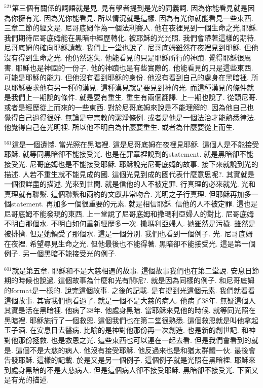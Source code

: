 \documentclass{book}
\begin{document}
$^{521}$第三個有關係的詞語就是見.
見有學者提到是光的同義詞.
因為你能看見就是因為你擁有光.
因為光你能看見.
所以情況就是這樣.
因為有光你就能看見一些東西.
三章二節的經文是.
尼哥底姆作為一個法利賽人.
他在夜裡見到一個生命之光,耶穌.
我們期待尼哥底姆能在黑暗中經歷轉化.
被耶穌的光光照.
我們會帶著這樣的期待.
尼哥底姆的確向耶穌請教.
我們上一堂也說了.
尼哥底姆雖然在夜裡見到耶穌.
但他沒有得到生命之光.
他仍然迷失.
他能看見的只是耶穌所行的神蹟.
覺得耶穌很厲害.
耶穌也是神國的一份子.
他的神蹟也是有些實際的.
他能看見的只是這些東西.
可能是耶穌的能力.
但他沒有看到耶穌的身份.
他沒有看到自己的處身在黑暗裡.
所以耶穌要求他有另一種的漢見.
這種漢見就是要見到神的光.
而這種漢見的條件就是我們上一期說的條件.
就是要有重生.
重生有兩個翻譯.
上一期也說了.
從頭尼哥.
或者是經歷從上而來的一些東西.
對於尼哥底姆來說是不能理解的.
因為他自己也覺得自己過得很好.
無論是守宗教的潔淨條例.
或者是他是一個法治才能熟悉律法.
他覺得自己在光明裡.
所以他不明白為什麼要重生.
或者為什麼要從上而生.

$^{561}$這是一個遺憾.
當光照在黑暗裡.
這是尼哥底姆在夜裡見耶穌.
這個人是不能接受耶穌.
就等同黑暗卻不能接受光.
也是在罪章裡說到的statement.
就是黑暗卻不能接受光.
尼哥底姆也是不能接受耶穌.
耶穌說完尼哥底姆的故事.
接下來就說到光的描述.
人若不重生就不能見成的國.
這個光見到成的國代表什麼意思呢?.
其實就是一個很詳盡的描述.
光來到世間.
就是信他的人不被定罪.
行真理的必來就光.
光和真理就有聯繫.
這個聯繫和兩約的文獻非常吻合.
光明之子行真理.
但耶穌再加多一個statement.
再加多一個很重要的元素.
就是相信耶穌.
信他的人不被定罪.
這也是尼哥底姆不能發現的東西.
上一堂說了尼哥底姆和撒瑪利亞婦人的對比.
尼哥底姆不明白那個水.
不明白如何重新經歷多一次.
撒瑪利亞婦人.
她雖然是污穢.
雖然是被排擠.
但是她領受了那個水.
這是一個分別.
我們也看到一個例子.
光.
尼哥底姆在夜裡.
希望尋見生命之光.
但他最後也不能得著.
黑暗卻不能接受光.
這是第一個例子.
另一個黑暗不能接受光的例子.

$^{601}$就是第五章.
耶穌和不是大慈相遇的故事.
這個故事我們也在第二堂說.
安息日節期的時候也說過.
這個故事為什麼和光有關呢?.
就是因為同樣的例子.
和尼哥底姆的format是一樣的.
說完這個故事.
之後的記載.
是有提到光這個元素.
我們就看看這個故事.
其實我們也看過了.
就是一個不是大慈的病人.
他病了38年.
無疑這個人其實是活在黑暗裡.
他病了38年.
他處身黑暗.
當耶穌來見他的時候.
就等同光照在黑暗裡.
耶穌施行了一個救恩.
這個我們也在第二堂很熟悉.
這個救恩就是叫他拿起玉子酒.
在安息日去醫病.
比喻的是神對他那份再一次創造.
也是新的創世記.
和神對他那份拯救.
也是救恩之光.
這些東西也可以連在一起去看.
但是我們會看到的就是.
這個不是大慈的病人.
他沒有接受耶穌.
他反過來也是和猶太群體一伙.
最後會告發耶穌.
這樣的記載.
於是又是另一個例子.
這個例子就是光照在黑暗裡.
耶穌來到處身黑暗的不是大慈病人.
但是這個病人卻不接受耶穌.
黑暗卻不接受光.
下面又是有光的描述.
\end{document}
